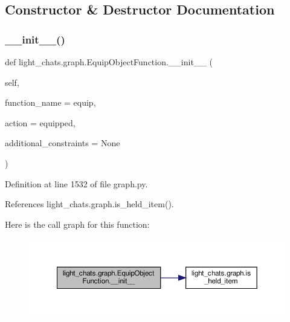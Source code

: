 \subsection{Constructor \& Destructor Documentation}
\mbox{\label{classlight__chats_1_1graph_1_1EquipObjectFunction_ae9d5525c470e81b3cd05871ceb0bfc36}} 
\subsubsection{\texorpdfstring{\+\_\+\+\_\+init\+\_\+\+\_\+()}{\_\_init\_\_()}}
{\footnotesize\ttfamily def light\+\_\+chats.\+graph.\+Equip\+Object\+Function.\+\_\+\+\_\+init\+\_\+\+\_\+ (\begin{DoxyParamCaption}\item[{}]{self,  }\item[{}]{function\+\_\+name = {\ttfamily \textquotesingle{}equip\textquotesingle{}},  }\item[{}]{action = {\ttfamily \textquotesingle{}equipped\textquotesingle{}},  }\item[{}]{additional\+\_\+constraints = {\ttfamily None} }\end{DoxyParamCaption})}



Definition at line 1532 of file graph.\+py.



References light\+\_\+chats.\+graph.\+is\+\_\+held\+\_\+item().

Here is the call graph for this function\+:
\nopagebreak
\begin{figure}[H]
\begin{center}
\leavevmode
\includegraphics[width=350pt]{classlight__chats_1_1graph_1_1EquipObjectFunction_ae9d5525c470e81b3cd05871ceb0bfc36_cgraph}
\end{center}
\end{figure}


